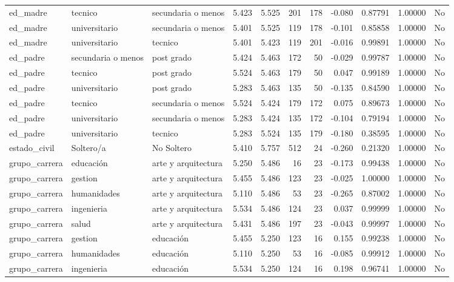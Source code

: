 \documentclass[
  letterpaper,
  DIV=11,
  numbers=noendperiod]{scrartcl}
\begin{document}
\begin{table}
\begin{tabular*}{\linewidth}{@{\extracolsep{\fill}}lllrrrrrrrl}
ed\_madre & tecnico & secundaria o menos & 5.423 & 5.525 & 201 & 178 & -0.080 & 0.87791 & 1.00000 & No \\ 
ed\_madre & universitario & secundaria o menos & 5.401 & 5.525 & 119 & 178 & -0.101 & 0.85858 & 1.00000 & No \\ 
ed\_madre & universitario & tecnico & 5.401 & 5.423 & 119 & 201 & -0.016 & 0.99891 & 1.00000 & No \\ 
ed\_padre & secundaria o menos & post grado & 5.424 & 5.463 & 172 & 50 & -0.029 & 0.99787 & 1.00000 & No \\ 
ed\_padre & tecnico & post grado & 5.524 & 5.463 & 179 & 50 & 0.047 & 0.99189 & 1.00000 & No \\ 
ed\_padre & universitario & post grado & 5.283 & 5.463 & 135 & 50 & -0.135 & 0.84590 & 1.00000 & No \\ 
ed\_padre & tecnico & secundaria o menos & 5.524 & 5.424 & 179 & 172 & 0.075 & 0.89673 & 1.00000 & No \\ 
ed\_padre & universitario & secundaria o menos & 5.283 & 5.424 & 135 & 172 & -0.104 & 0.79194 & 1.00000 & No \\ 
ed\_padre & universitario & tecnico & 5.283 & 5.524 & 135 & 179 & -0.180 & 0.38595 & 1.00000 & No \\ 
estado\_civil & Soltero/a & No Soltero & 5.410 & 5.757 & 512 & 24 & -0.260 & 0.21320 & 1.00000 & No \\ 
grupo\_carrera & educación & arte y arquitectura & 5.250 & 5.486 & 16 & 23 & -0.173 & 0.99438 & 1.00000 & No \\ 
grupo\_carrera & gestion & arte y arquitectura & 5.455 & 5.486 & 123 & 23 & -0.025 & 1.00000 & 1.00000 & No \\ 
grupo\_carrera & humanidades & arte y arquitectura & 5.110 & 5.486 & 53 & 23 & -0.265 & 0.87002 & 1.00000 & No \\ 
grupo\_carrera & ingenieria & arte y arquitectura & 5.534 & 5.486 & 124 & 23 & 0.037 & 0.99999 & 1.00000 & No \\ 
grupo\_carrera & salud & arte y arquitectura & 5.431 & 5.486 & 197 & 23 & -0.043 & 0.99997 & 1.00000 & No \\ 
grupo\_carrera & gestion & educación & 5.455 & 5.250 & 123 & 16 & 0.155 & 0.99238 & 1.00000 & No \\ 
grupo\_carrera & humanidades & educación & 5.110 & 5.250 & 53 & 16 & -0.085 & 0.99912 & 1.00000 & No \\ 
grupo\_carrera & ingenieria & educación & 5.534 & 5.250 & 124 & 16 & 0.198 & 0.96741 & 1.00000 & No \\ 

\end{tabular*}
\end{table}
\end{document}
